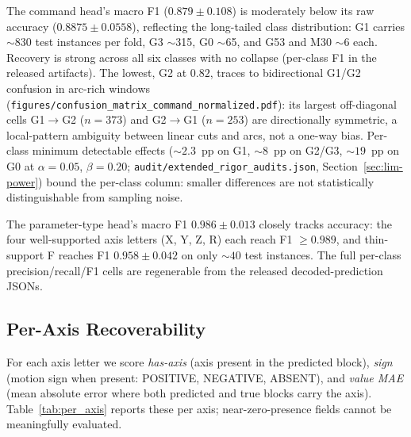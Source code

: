 \documentclass[sensors,article,submit,moreauthors,pdftex]{Definitions/mdpi}
\begin{document}




The command head's macro F1 ($0.879 \pm 0.108$) is moderately below its raw accuracy ($0.8875 \pm 0.0558$), reflecting the long-tailed class distribution: G1 carries $\sim$830 test instances per fold, G3 $\sim$315, G0 $\sim$65, and G53 and M30 $\sim$6 each. Recovery is strong across all six classes with no collapse (per-class F1 in the released artifacts). The lowest, G2 at $0.82$, traces to bidirectional G1/G2 confusion in arc-rich windows (\texttt{figures/confusion\_matrix\_command\_normalized.pdf}): its largest off-diagonal cells G1$\to$G2 ($n\!=\!373$) and G2$\to$G1 ($n\!=\!253$) are directionally symmetric, a local-pattern ambiguity between linear cuts and arcs, not a one-way bias. Per-class minimum detectable effects ($\sim$$2.3$~pp on G1, $\sim$$8$~pp on G2/G3, $\sim$$19$~pp on G0 at $\alpha\!=\!0.05$, $\beta\!=\!0.20$; \texttt{audit/extended\_rigor\_audits.json}, Section~\ref{sec:lim-power}) bound the per-class column: smaller differences are not statistically distinguishable from sampling noise.





The parameter-type head's macro F1 $0.986 \pm 0.013$ closely tracks accuracy: the four well-supported axis letters (X, Y, Z, R) each reach F1 $\ge\!0.989$, and thin-support F reaches F1 $0.958 \pm 0.042$ on only $\sim$$40$ test instances. The full per-class precision/recall/F1 cells are regenerable from the released decoded-prediction JSONs.

\subsection{Per-Axis Recoverability}
\label{sec:per-axis}

For each axis letter we score \emph{has-axis} (axis present in the predicted block), \emph{sign} (motion sign when present: POSITIVE, NEGATIVE, ABSENT), and \emph{value MAE} (mean absolute error where both predicted and true blocks carry the axis). Table~\ref{tab:per_axis} reports these per axis; near-zero-presence fields cannot be meaningfully evaluated.



\end{document}
